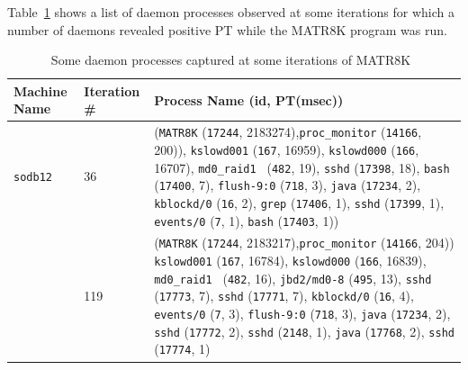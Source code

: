 Table~\ref{tab:daemon3} shows a list of daemon processes 
observed at some iterations for which a number of daemons revealed positive PT while the MATR8K program was run.
\begin{table}[htp!]
\centering
{ %
 \begin{tabular}{|p{1.5cm}|p{2cm}|p{12.5cm}|} \hline
Machine Name & Iteration \# & Process Name (id, PT(msec))\\ \hline
 {\tt sodb12}  & 
 36 & ({\tt MATR8K} ({\tt 17244}, 2183274),{\tt proc\_monitor} ({\tt 14166}, 200)), 
 {\tt kslowd001} ({\tt 167}, 16959),  {\tt kslowd000} ({\tt 166}, 16707), 
 {\tt md0\_raid1 } ({\tt 482}, 19),  {\tt sshd} ({\tt 17398}, 18), {\tt bash}  ({\tt 17400}, 7),  
 {\tt flush-9:0} ({\tt 718}, 3), {\tt java} ({\tt 17234}, 2), {\tt kblockd/0} ({\tt 16}, 2), 
 {\tt grep} ({\tt 17406}, 1), {\tt sshd} ({\tt 17399}, 1), 
 {\tt events/0} ({\tt 7}, 1), {\tt bash} ({\tt 17403}, 1))\\ \cline{2-3} 
&  119 & ({\tt MATR8K} ({\tt 17244}, 2183217),{\tt proc\_monitor} ({\tt 14166}, 204))
 {\tt kslowd001} ({\tt 167}, 16784),  {\tt kslowd000} ({\tt 166}, 16839), 
 {\tt md0\_raid1 } ({\tt 482}, 16),  {\tt  jbd2/md0-8} ({\tt 495}, 13), 
 {\tt sshd} ({\tt 17773}, 7), {\tt sshd} ({\tt 17771}, 7), 
 {\tt kblockd/0} ({\tt 16}, 4),  {\tt events/0} ({\tt 7}, 3), 
 {\tt flush-9:0} ({\tt 718}, 3), {\tt java} ({\tt 17234}, 2), 
 {\tt sshd} ({\tt 17772}, 2),  {\tt sshd} ({\tt 2148}, 1), 
 {\tt java} ({\tt 17768}, 2), {\tt sshd} ({\tt 17774}, 1)\\ \cline{2-3}
 \hline
 \end{tabular}
  }
 \caption{Some daemon processes captured at some iterations of MATR8K~\label{tab:daemon3}}
\end{table}
